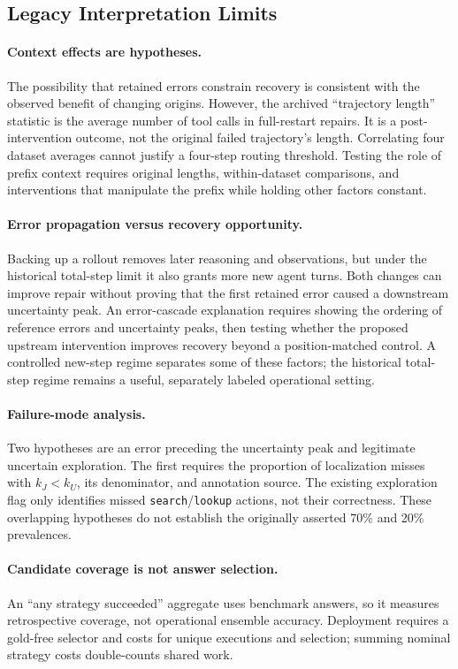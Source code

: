 \documentclass{article}
\begin{document}
\subsection{Legacy Interpretation Limits}
\paragraph{Context effects are hypotheses.}
The possibility that retained errors constrain recovery is consistent
with the observed benefit of changing origins. However, the archived
``trajectory length'' statistic is the average number of tool calls in
full-restart repairs. It is a post-intervention outcome, not the original
failed trajectory's length. Correlating four dataset averages cannot
justify a four-step routing threshold. Testing the role of prefix context
requires original lengths, within-dataset comparisons, and interventions
that manipulate the prefix while holding other factors constant.

\paragraph{Error propagation versus recovery opportunity.}
Backing up a rollout removes later reasoning and observations, but under
the historical total-step limit it also grants more new agent turns.
Both changes can improve repair without proving that the first retained
error caused a downstream uncertainty peak. An error-cascade explanation
requires showing the ordering of reference errors and uncertainty peaks,
then testing whether the proposed upstream intervention improves recovery
beyond a position-matched control. A controlled new-step regime separates
some of these factors; the historical total-step regime remains a useful,
separately labeled operational setting.

\paragraph{Failure-mode analysis.}
Two hypotheses are an error preceding the uncertainty peak and legitimate
uncertain exploration. The first requires the proportion of localization
misses with $k_J<k_U$, its denominator, and annotation source. The existing
exploration flag only identifies missed \texttt{search}/\texttt{lookup}
actions, not their correctness. These overlapping hypotheses do not
establish the originally asserted 70\% and 20\% prevalences.

\paragraph{Candidate coverage is not answer selection.}
An ``any strategy succeeded'' aggregate uses benchmark answers, so it
measures retrospective coverage, not operational ensemble accuracy.
Deployment requires a gold-free selector and costs for unique executions
and selection; summing nominal strategy costs double-counts shared work.
\end{document}
